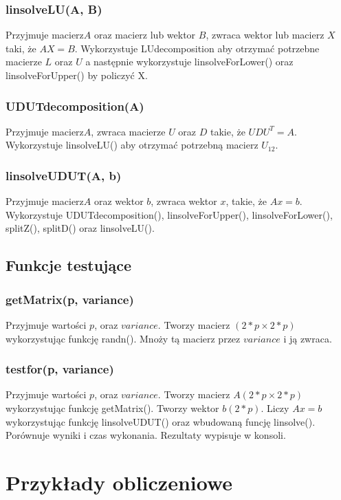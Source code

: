 \documentclass{article}
\begin{document}
        \subsubsection*{linsolveLU(A, B)}
        Przyjmuje macierz\(A\) oraz macierz lub wektor \(B\), zwraca wektor lub macierz \(X\) taki, że \(AX = B\). Wykorzystuje LUdecomposition aby otrzymać potrzebne macierze \(L\) oraz \(U\) a następnie wykorzystuje linsolveForLower() oraz linsolveForUpper() by policzyć X.
        \subsubsection*{UDUTdecomposition(A)}
        Przyjmuje macierz\(A\), zwraca macierze \(U\) oraz \(D\) takie, że \(UDU^T = A\). Wykorzystuje linsolveLU() aby otrzymać potrzebną macierz \(U_{12}\).
        \subsubsection*{linsolveUDUT(A, b)}
        Przyjmuje macierz\(A\) oraz wektor \(b\), zwraca wektor \(x\), takie, że \(Ax = b\). Wykorzystuje UDUTdecomposition(), linsolveForUpper(), linsolveForLower(), splitZ(), splitD() oraz linsolveLU().
    \subsection*{Funkcje testujące}
        \subsubsection*{getMatrix(p, variance)}
        Przyjmuje wartości \(p\), oraz \(variance\). Tworzy macierz \((2*p \times 2*p)\) wykorzystując funkcję randn(). Mnoży tą macierz przez \(variance\) i ją zwraca.
        \subsubsection*{testfor(p, variance)}
        Przyjmuje wartości \(p\), oraz \(variance\). Tworzy macierz \(A(2*p \times 2*p)\) wykorzystując funkcję getMatrix(). Tworzy wektor \(b(2*p)\). Liczy \(Ax = b\) wykorzystując funkcję linsolveUDUT() oraz wbudowaną funcję linsolve(). Porównuje wyniki i czas wykonania. Rezultaty wypisuje w konsoli.

\newpage
\section{Przykłady obliczeniowe}
\vspace{12pt}
\end{document}
